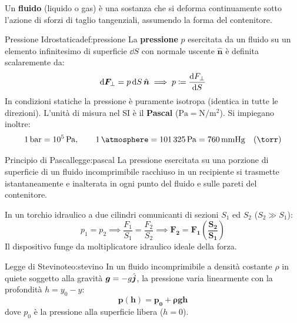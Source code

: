 Un \textbf{fluido} (liquido o gas) è una sostanza che si deforma continuamente sotto l'azione di sforzi di taglio tangenziali, assumendo la forma del contenitore.

\begin{definizione}{Pressione Idrostatica}{def:pressione}
La \textbf{pressione} $p$ esercitata da un fluido su un elemento infinitesimo di superficie $\dd S$ con normale uscente $\hat{\bm{n}}$ è definita scalaremente da:
\begin{equation}
    \mathrm{d}\bm{F}_\perp = p\,\mathrm{d} S\,\hat{\bm{n}} \implies p \coloneqq \frac{\mathrm{d} F_\perp}{\mathrm{d} S}
    \label{eq:pressione_def}
\end{equation}
In condizioni statiche la pressione è puramente isotropa (identica in tutte le direzioni). L'unità di misura nel SI è il \textbf{Pascal} ($\si{\pascal} = \si{\newton\per\metre\squared}$). Si impiegano inoltre:
\begin{equation}
    \SI{1}{\bar} = 10^5\,\si{\pascal}, \qquad \SI{1}{\atmosphere} = \SI{101325}{\pascal} = \SI{760}{\milli\metre Hg} \quad (\si{\torr})
\end{equation}
\end{definizione}

\begin{legge}{Principio di Pascal}{legge:pascal}
La pressione esercitata su una porzione di superficie di un fluido incomprimibile racchiuso in un recipiente si trasmette istantaneamente e inalterata in ogni punto del fluido e sulle pareti del contenitore.
\end{legge}

\begin{esempio}
In un torchio idraulico a due cilindri comunicanti di sezioni $S_1$ ed $S_2$ ($S_2 \gg S_1$):
\begin{equation}
    p_1 = p_2 \implies \frac{F_1}{S_1} = \frac{F_2}{S_2} \implies \mathbf{F_2 = F_1\left(\frac{S_2}{S_1}\right)}
\end{equation}
Il dispositivo funge da moltiplicatore idraulico ideale della forza.
\end{esempio}

\begin{teorema}{Legge di Stevino}{teo:stevino}
In un fluido incomprimibile a densità costante $\rho$ in quiete soggetto alla gravità $\bm{g} = -g\hat{\bm{j}}$, la pressione varia linearmente con la profondità $h = y_0 - y$:
\begin{equation}
    \mathbf{p(h) = p_0 + \rho g h}
    \label{eq:legge_stevino}
\end{equation}
dove $p_0$ è la pressione alla superficie libera ($h=0$).
\end{teorema}

